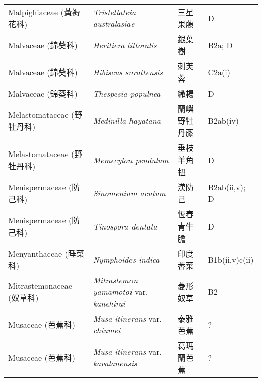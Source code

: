 \begin{longtable}{p{3cm}p{5cm}p{3cm}p{4cm}}
    Malpighiaceae (黃褥花科) & \textit{Tristellateia australasiae}  & 三星果藤 & D \index{Tristellateia@\textit{Tristellateia}!australasiae@\textit{australasiae}}  \index{三星果藤} \\
    Malvaceae (錦葵科) & \textit{Heritiera littoralis}  & 銀葉樹 & B2a; D \index{Heritiera@\textit{Heritiera}!littoralis@\textit{littoralis}}  \index{銀葉樹} \\
    Malvaceae (錦葵科) & \textit{Hibiscus surattensis}  & 刺芙蓉 & C2a(i) \index{Hibiscus@\textit{Hibiscus}!surattensis@\textit{surattensis}}  \index{刺芙蓉} \\
    Malvaceae (錦葵科) & \textit{Thespesia populnea}  & 繖楊 & D \index{Thespesia@\textit{Thespesia}!populnea@\textit{populnea}}  \index{繖楊} \\
    Melastomataceae (野牡丹科) & \textit{Medinilla hayatana}  & 蘭嶼野牡丹藤 & B2ab(iv) \index{Medinilla@\textit{Medinilla}!hayatana@\textit{hayatana}}  \index{蘭嶼野牡丹藤} \\
    Melastomataceae (野牡丹科) & \textit{Memecylon pendulum}  & 垂枝羊角扭 & D \index{Memecylon@\textit{Memecylon}!pendulum@\textit{pendulum}}  \index{垂枝羊角扭} \\
    Menispermaceae (防己科) & \textit{Sinomenium acutum}  & 漢防己 & B2ab(ii,v); D \index{Sinomenium@\textit{Sinomenium}!acutum@\textit{acutum}}  \index{漢防己} \\
    Menispermaceae (防己科) & \textit{Tinospora dentata}  & 恆春青牛膽 & D \index{Tinospora@\textit{Tinospora}!dentata@\textit{dentata}}  \index{恆春青牛膽} \\
    Menyanthaceae (睡菜科) & \textit{Nymphoides indica}  & 印度莕菜 & B1b(ii,v)c(ii) \index{Nymphoides@\textit{Nymphoides}!indica@\textit{indica}}  \index{印度莕菜} \\
    Mitrastemonaceae (奴草科) & \textit{Mitrastemon yamamotoi} var. \textit{kanehirai}  & 菱形奴草 & B2 \index{Mitrastemon@\textit{Mitrastemon}!yamamotoi@\textit{yamamotoi}!var. kanehirai@var. \textit{kanehirai}}  \index{菱形奴草} \\
    Musaceae (芭蕉科) & \textit{Musa itinerans} var. \textit{chiumei}  & 泰雅芭蕉 & ? \index{Musa@\textit{Musa}!itinerans@\textit{itinerans}!var. chiumei@var. \textit{chiumei}}  \index{泰雅芭蕉} \\
    Musaceae (芭蕉科) & \textit{Musa itinerans} var. \textit{kavalanensis}  & 葛瑪蘭芭蕉 & ? \index{Musa@\textit{Musa}!itinerans@\textit{itinerans}!var. kavalanensis@var. \textit{kavalanensis}}  \index{葛瑪蘭芭蕉} \\

\end{longtable}
